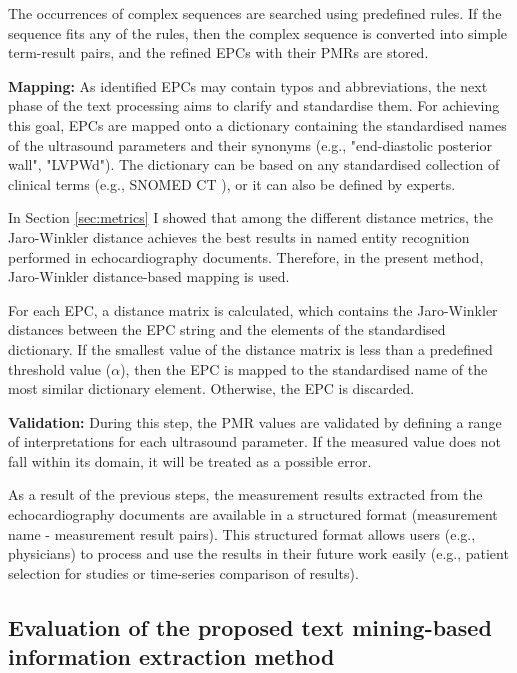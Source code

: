 The occurrences of complex sequences are searched using predefined rules. If the sequence fits any of the rules, then the complex sequence is converted into simple term-result pairs, and the refined EPCs with their PMRs are stored.

\textbf{Mapping:} As identified EPCs may contain typos and abbreviations, the next phase of the text processing aims to clarify and standardise them. For achieving this goal, EPCs are mapped onto a dictionary containing the standardised names of the ultrasound parameters and their synonyms (e.g., "end-diastolic posterior wall", "LVPWd"). The dictionary can be based on any standardised collection of clinical terms (e.g., SNOMED CT \cite{donnelly2006snomed}), or it can also be defined by experts.

In Section \ref{sec:metrics} I showed that among the different distance metrics, the Jaro-Winkler distance achieves the best results in named entity recognition performed in echocardiography documents. Therefore, in the present method, Jaro-Winkler distance-based mapping is used.

For each EPC, a distance matrix is calculated, which contains the Jaro-Winkler distances between the EPC string and the elements of the standardised dictionary. If the smallest value of the distance matrix is less than a predefined threshold value ($\alpha$), then the EPC is mapped to the standardised name of the most similar dictionary element. Otherwise, the EPC is discarded.

\textbf{Validation:} During this step, the PMR values are validated by defining a range of interpretations for each ultrasound parameter. If the measured value does not fall within its domain, it will be treated as a possible error.

As a result of the previous steps, the measurement results extracted from the echocardiography documents are available in a structured format (measurement name - measurement result pairs). This structured format allows users (e.g., physicians) to process and use the results in their future work easily (e.g., patient selection for studies or time-series comparison of results). 

\subsection{Evaluation of the proposed text mining-based information extraction method}
\label{sec:eval_text_mining}

